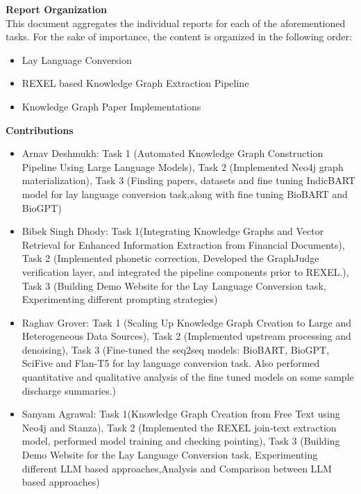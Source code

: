 \documentclass[12pt]{article}
\begin{document}
\vspace{1.5em}
\noindent \textbf{Report Organization} \\
This document aggregates the individual reports for each of the aforementioned tasks. For the sake of importance, the content is organized in the following order:

\begin{itemize}
    \item {Lay Language Conversion}
    \item {REXEL based Knowledge Graph Extraction Pipeline}
    \item {Knowledge Graph Paper Implementations}
\end{itemize}

\vspace{1.5em}
\noindent \textbf{Contributions} \\
\begin{itemize}
    \item Arnav Deshmukh: Task 1 (Automated Knowledge Graph Construction Pipeline Using Large Language Models), Task 2 (Implemented Neo4j graph materialization), Task 3 (Finding papers, datasets and fine tuning IndicBART model for lay language conversion task,along with fine tuning BioBART and BioGPT)
    \item Bibek Singh Dhody: Task 1(Integrating Knowledge Graphs and Vector Retrieval for Enhanced Information Extraction from Financial Documents), Task 2 (Implemented phonetic correction, Developed the GraphJudge verification layer, and integrated the pipeline components prior to REXEL.), Task 3 (Building Demo Website for the Lay Language Conversion task, Experimenting different prompting strategies)
    \item Raghav Grover: Task 1 (Scaling Up Knowledge Graph Creation to Large and Heterogeneous Data Sources), Task 2 (Implemented upstream processing and denoising), Task 3 (Fine-tuned the seq2seq models: BioBART, BioGPT, SciFive and Flan-T5 for lay language conversion task. Also performed quantitative and qualitative analysis of the fine tuned models on some sample discharge summaries.)
    \item Sanyam Agrawal: Task 1(Knowledge Graph Creation from Free Text using Neo4j and Stanza), Task 2 (Implemented the REXEL join-text extraction model, performed model training and checking pointing), Task 3 (Building Demo Website for the Lay Language Conversion task, Experimenting different LLM based approaches,Analysis and Comparison between LLM based approaches)
\end{itemize}
\end{document}

